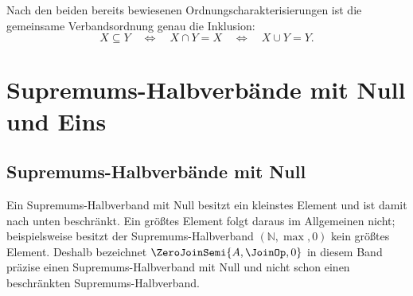 \documentclass[main.tex]{subfiles}
\begin{document}
\begin{tabproofsplitwide}
  \closeproofpartwide
\end{tabproofsplitwide}

Nach den beiden bereits bewiesenen Ordnungscharakterisierungen ist die
gemeinsame Verbandsordnung genau die Inklusion:
\[
  X\subseteq Y
  \quad\Longleftrightarrow\quad
  X\cap Y=X
  \quad\Longleftrightarrow\quad
  X\cup Y=Y.
\]


\chapter{Supremums-Halbverbände mit Null und Eins}

\section{Supremums-Halbverbände mit Null}

Ein Supremums-Halbverband mit Null besitzt ein kleinstes Element und ist
damit nach unten beschränkt. Ein größtes Element folgt daraus im Allgemeinen
nicht; beispielsweise besitzt der Supremums-Halbverband
\((\mathbb{N},\max,0)\) kein größtes Element. Deshalb bezeichnet
\(\ZeroJoinSemi{A,\JoinOp,0}\) in diesem Band präzise einen
Supremums-Halbverband mit Null und nicht schon einen beschränkten
Supremums-Halbverband.
\end{document}
